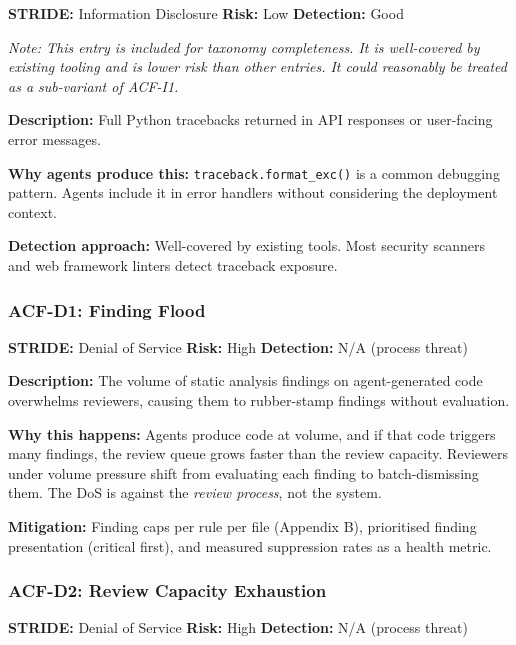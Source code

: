 \documentclass[a4paper,11pt]{report}
\begin{document}
\textbf{STRIDE:} Information Disclosure \textbar{} \textbf{Risk:} Low
\textbar{} \textbf{Detection:} Good

\emph{Note: This entry is included for taxonomy completeness. It is
well-covered by existing tooling and is lower risk than other entries.
It could reasonably be treated as a sub-variant of ACF-I1.}

\textbf{Description:} Full Python tracebacks returned in API responses
or user-facing error messages.

\textbf{Why agents produce this:} \texttt{traceback.format\_exc()} is a
common debugging pattern. Agents include it in error handlers without
considering the deployment context.

\textbf{Detection approach:} Well-covered by existing tools. Most
security scanners and web framework linters detect traceback exposure.

\hypertarget{acf-d1-finding-flood}{%
\subsubsection{ACF-D1: Finding Flood}\label{acf-d1-finding-flood}}

\textbf{STRIDE:} Denial of Service \textbar{} \textbf{Risk:} High
\textbar{} \textbf{Detection:} N/A (process threat)

\textbf{Description:} The volume of static analysis findings on
agent-generated code overwhelms reviewers, causing them to rubber-stamp
findings without evaluation.

\textbf{Why this happens:} Agents produce code at volume, and if that
code triggers many findings, the review queue grows faster than the
review capacity. Reviewers under volume pressure shift from evaluating
each finding to batch-dismissing them. The DoS is against the
\emph{review process}, not the system.

\textbf{Mitigation:} Finding caps per rule per file (Appendix B),
prioritised finding presentation (critical first), and measured
suppression rates as a health metric.

\hypertarget{acf-d2-review-capacity-exhaustion}{%
\subsubsection{ACF-D2: Review Capacity
Exhaustion}\label{acf-d2-review-capacity-exhaustion}}

\textbf{STRIDE:} Denial of Service \textbar{} \textbf{Risk:} High
\textbar{} \textbf{Detection:} N/A (process threat)
\end{document}
